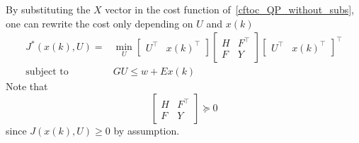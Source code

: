 By substituting the $X$ vector in the cost function of~\ref{cftoc_QP_without_subs}, one can rewrite the cost only depending on $U$ and $x(k)$
\begin{align*}
    J^*(x(k), U)=          & \min_{U}\begin{bmatrix}
                                         U^\top & {x(k)}^\top
                                     \end{bmatrix}
    \begin{bmatrix}
        H & F^\top \\
        F & Y
    \end{bmatrix}
    {\begin{bmatrix}
         U^\top & {x(k)}^\top
     \end{bmatrix}}^\top                                 \\
    \text{subject to}\quad & GU \leq w + Ex(k)
\end{align*}
Note that
\begin{equation*}
    \begin{bmatrix}H&F^\top\\F&Y\end{bmatrix}\succeq0
\end{equation*}
since $J(x(k),U) \geq 0$ by assumption.

\newpar{}

